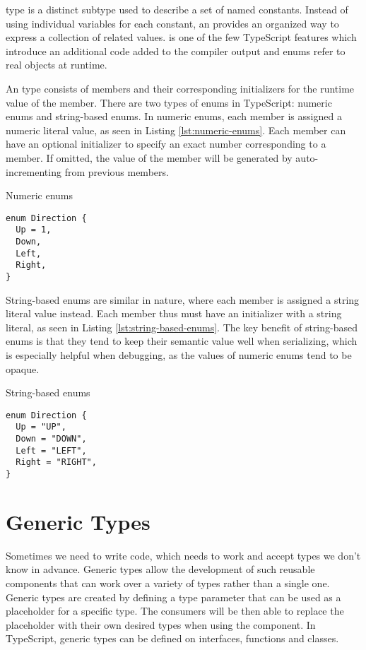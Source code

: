  type is a distinct subtype used to describe a set of named constants. Instead of using individual variables for each constant, an  provides an organized way to express a collection of related values.  is one of the few TypeScript features which introduce an additional code added to the compiler output and enums refer to real objects at runtime.

An  type consists of members and their corresponding initializers for the runtime value of the member. There are two types of enums in TypeScript: numeric enums and string-based enums. In numeric enums, each member is assigned a numeric literal value, as seen in Listing \ref{lst:numeric-enums}. Each member can have an optional initializer to specify an exact number corresponding to a member. If omitted, the value of the member will be generated by auto-incrementing from previous members.

\begin{listing}[h]
  \caption{Numeric enums}\label{lst:numeric-enums}
  \begin{verbatim}
enum Direction {
  Up = 1,
  Down,
  Left,
  Right,
}
\end{verbatim}
\end{listing}

String-based enums are similar in nature, where each member is assigned a string literal value instead. Each member thus must have an initializer with a string literal, as seen in Listing \ref{lst:string-based-enums}. The key benefit of string-based enums is that they tend to keep their semantic value well when serializing, which is especially helpful when debugging, as the values of numeric enums tend to be opaque.

\begin{listing}[h]
  \caption{String-based enums}\label{lst:string-based-enums}
  \begin{verbatim}
enum Direction {
  Up = "UP",
  Down = "DOWN",
  Left = "LEFT",
  Right = "RIGHT",
}
\end{verbatim}
\end{listing}

\section{Generic Types}

Sometimes we need to write code, which needs to work and accept types we don't know in advance. Generic types allow the development of such reusable components that can work over a variety of types rather than a single one. Generic types are created by defining a type parameter that can be used as a placeholder for a specific type. The consumers will be then able to replace the placeholder with their own desired types when using the component. In TypeScript, generic types can be defined on interfaces, functions and classes.

